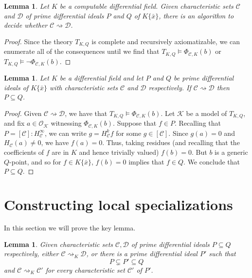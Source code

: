 \documentclass[12pt]{amsart}
\newtheorem{lemma}[theorem]{Lemma}
\theoremstyle{definition}
\numberwithin{subcase}{cases}
\theoremstyle{remark}
\newcommand{\mc}[1]{\mathcal{#1}}
\begin{document}
\begin{lemma}\label{lem:decidability-of-arrow}
    Let $K$ be a computable differential field. Given characteristic sets $\mc{C}$ and $\mc{D}$ of prime differential ideals $P$ and $Q$ of $K\{\bar{x}\}$, there is an algorithm to decide whether $\mc{C} \rightsquigarrow \mc{D}$.
\end{lemma}
\begin{proof}
    Since the theory $T_{K,Q}$ is complete and recursively axiomatizable, we can enumerate all of the consequences until we find that $T_{K,Q}\models\Phi_{\mathcal C,K}(b)$ or $T_{K,Q}\models \neg \Phi_{\mathcal C,K}(b)$.
\end{proof}

\begin{lemma}\label{lem:prime-ideal-containment}
    Let $K$ be a differential field and let $P$ and $Q$ be prime differential ideals of $K\{\bar{x}\}$ with characteristic sets $\mc{C}$ and $\mc{D}$ respectively. If $\mc{C} \rightsquigarrow \mc{D}$ then $P \subseteq Q$.
\end{lemma}
\begin{proof}
    Given $\mc{C} \rightsquigarrow \mc{D}$, we have that $T_{K,Q}\models\Phi_{\mathcal C,K}(b)$. Let $\mc{K}$ be a model of $T_{K,Q}$, and fix $a \in \mc{O}_{\mc{K}}$ witnessing $\Phi_{\mc{C},K}(b)$. Suppose that $f \in P$. Recalling that $P = [\mc{C}] : H_{\mc{C}}^\infty$, we can write $g = H_{\mc{C}}^k f$ for some $g \in [\mc{C}]$. Since $g(a) = 0$ and $H_{\mc{C}}(a) \neq 0$, we have $f(a) = 0$. Thus, taking residues (and recalling that the coefficients of $f$ are in $K$ and hence trivially valued) $f(b) = 0$. But $b$ is a generic $Q$-point, and so for $f \in K\{\bar{x}\}$, $f(b) = 0$ implies that $f \in Q$. We conclude that $P \subseteq Q$.
\end{proof}

\section{Constructing local specializations} \label{specsec}

In this section we will prove the key lemma.

\begin{lemma}\label{lem:strict-step}
Given characteristic sets $\mathcal C,\mathcal D$ of prime differential
ideals $P \subseteq Q$ respectively, either
$\mathcal C\rightsquigarrow_K\mathcal D$, or there is a prime differential
ideal $P'$ such that
\[
  P\subsetneq P'\subseteq Q
\]
and $\mathcal C\rightsquigarrow_K\mathcal C'$ for every characteristic set
$\mathcal C'$ of $P'$.
\end{lemma}
\end{document}
